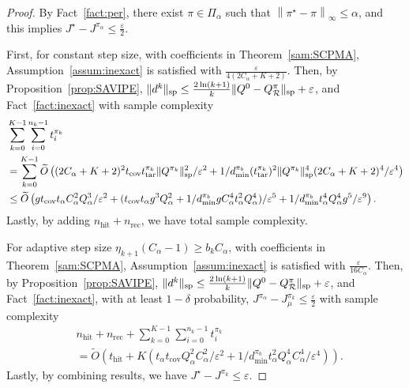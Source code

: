 \documentclass{article}
\theoremstyle{definition}
\theoremstyle{remark}
\newcommand{\cR}{\mathcal{R}}
\newcommand*{\infn}[1]{\left\|{#1}\right\|_{\infty}}
\renewcommand{\sp}[1]{\|{#1}\|_\text{\rm sp}}
\begin{document}
\begin{proof}
By Fact~\ref{fact:per},
   there exist $\pi \in \Pi_{\alpha}$ such that $\infn{\pi^\star-\pi} \le \alpha$, and this implies $J^{\star} - J^{\pi_\alpha}
\le \frac{\varepsilon}{2}$. 

First, for constant step size, with coefficients in Theorem~\ref{sam:SCPMA},  Assumption~\ref{assum:inexact} is satisfied with $ \frac{\varepsilon}{4(2C_\alpha+K+2)}$. Then, by Proposition~\ref{prop:SAVIPE},    $\mbox{$\sp{d^k}$}\le  \mbox{$\frac{2\ln(k+1)}{k}\sp{Q^0-Q^\pi_\cR}+\varepsilon$}$,  and Fact~\ref{fact:inexact} with sample complexity 
 \begin{align*}
   & \sum^{K-1}_{k=0}\sum^{n_k-1}_{i=0}{t_i^{\pi_k}}\\&=\sum^{K-1}_{k=0}\widetilde{O}\left((2C_\alpha+K+2)^2t_{\mathrm{cov}}t^{\pi_k}_{\mathrm{tar}}\sp{Q^{\pi_k}}^2/\varepsilon^2+ 1/d^{\pi_b}_{\mathrm{min}} (t^{\pi_k}_{\mathrm{tar}})^2\sp{Q^{\pi_k}}^4(2C_\alpha+K+2)^4/\varepsilon^{4}\right)
\\&\le\widetilde{O}\left(gt_{\mathrm{cov}}t_{\alpha}C_\alpha^2Q_\alpha^3/\varepsilon^2+(t_{\mathrm{cov}}t_{\alpha}g^3Q_\alpha^2+1/d^{\pi_b}_{\mathrm{min}}g C^4_\alpha t_{\alpha}^2 Q_\alpha^4)/\varepsilon^5+ 1/d^{\pi_b}_{\mathrm{min}} t_{\alpha}^4Q_\alpha^4g^5/\varepsilon^{9}\right).
\end{align*} 
Lastly, by adding $n_{\mathrm{hit}}+n_{\mathrm{rec}}$, we have total sample complexity.

For adaptive step size $\eta_{k+1}(C_\alpha  - 1) \ge b_k C_\alpha $, with coefficients in Theorem~\ref{sam:SCPMA}, Assumption~\ref{assum:inexact} is satisfied with $ \frac{\varepsilon}{16C_\alpha}$. Then, by Proposition~\ref{prop:SAVIPE}, $\mbox{$\sp{d^k}$}\le  \mbox{$\frac{2\ln(k+1)}{k}\sp{Q^0-Q^\pi_\cR}+\varepsilon$}$,  and Fact~\ref{fact:inexact}, with at least $1-\delta$ probability, $ J^{\pi_\alpha}-J^{\pi_k}_\mu \le \frac{\varepsilon}{2}$ with sample complexity  
 \begin{align*}
   & n_{\mathrm{hit}}+n_{\mathrm{rec}}+\sum^{K-1}_{k=0}\sum^{n_k-1}_{i=0}{t_i^{\pi_k}}\\&=\widetilde{O}\left(t_{\mathrm{hit}}+K(t_\alpha t_{\mathrm{cov}} Q_\alpha^2C_\alpha^2/\varepsilon^{2}+ 1/d^{\pi_b}_{\mathrm{min}} t_\alpha^2Q_\alpha^4C_\alpha^4/\varepsilon^{4})\right).
\end{align*}  
 Lastly, by combining results, we have $J^\star-J^{\pi_{k}}\le \varepsilon$.


\end{proof}
\end{document}
